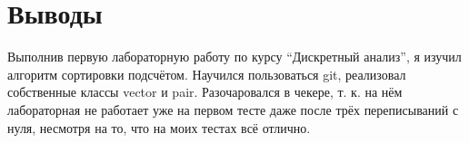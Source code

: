 \section{Выводы}
Выполнив первую лабораторную работу по курсу \enquote{Дискретный анализ}, я изучил алгоритм сортировки подсчётом. Научился пользоваться git, реализовал собственные классы vector и pair. Разочаровался в чекере, т. к. на нём лабораторная не работает уже на первом тесте даже после трёх переписываний с нуля, несмотря на то, что на моих тестах всё отлично.
\pagebreak
